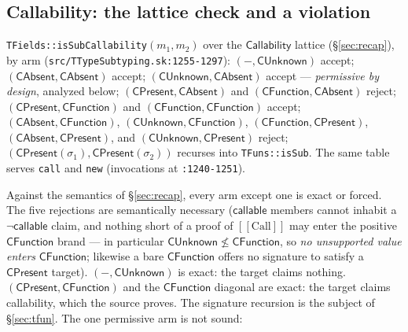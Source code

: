 \documentclass[11pt]{article}
\begin{document}
\subsection{Callability: the lattice check and a violation}
\label{sec:modes}

\begin{definition}
\label{def:callability-check}
\texttt{TFields::isSubCallability}$(m_1, m_2)$ over the
$\mathsf{Callability}$ lattice (\S\ref{sec:recap}), by arm
(\texttt{src/TTypeSubtyping.sk:1255-1297}):
$(-, \mathsf{CUnknown})$ accept;
$(\mathsf{CAbsent}, \mathsf{CAbsent})$ accept;
$(\mathsf{CUnknown}, \mathsf{CAbsent})$ accept --- \emph{permissive by design},
analyzed below;
$(\mathsf{CPresent}, \mathsf{CAbsent})$ and
$(\mathsf{CFunction}, \mathsf{CAbsent})$ reject;
$(\mathsf{CPresent}, \mathsf{CFunction})$ and
$(\mathsf{CFunction}, \mathsf{CFunction})$ accept;
$(\mathsf{CAbsent}, \mathsf{CFunction})$,
$(\mathsf{CUnknown}, \mathsf{CFunction})$,
$(\mathsf{CFunction}, \mathsf{CPresent})$,
$(\mathsf{CAbsent}, \mathsf{CPresent})$, and
$(\mathsf{CUnknown}, \mathsf{CPresent})$ reject;
$(\mathsf{CPresent}(\sigma_1), \mathsf{CPresent}(\sigma_2))$ recurses
into \texttt{TFuns::isSub}. The same table serves \texttt{call} and
\texttt{new} (invocations at \texttt{:1240-1251}).
\end{definition}

Against the semantics of \S\ref{sec:recap}, every arm except one is
exact or forced. The five rejections are semantically necessary
($\mathsf{callable}$ members cannot inhabit a
$\neg\mathsf{callable}$ claim, and nothing short of a proof of
$[[\mathrm{Call}]]$ may enter the positive $\mathsf{CFunction}$ brand
--- in particular $\mathsf{CUnknown} \not\leq \mathsf{CFunction}$, so
\emph{no unsupported value enters} $\mathsf{CFunction}$; likewise a bare
$\mathsf{CFunction}$ offers no signature to satisfy a
$\mathsf{CPresent}$ target). $(-, \mathsf{CUnknown})$ is exact: the
target claims nothing. $(\mathsf{CPresent}, \mathsf{CFunction})$ and
the $\mathsf{CFunction}$ diagonal are exact: the target claims
callability, which the source proves. The signature recursion is the
subject of \S\ref{sec:tfun}. The one permissive arm is not sound:
\end{document}
